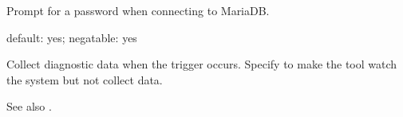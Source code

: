 \documentclass[letterpaper,10pt,english]{sphinxmanual}
\begin{document}
\begin{fulllineitems}
\label{\detokenize{mariadb-stat:cmdoption-mariadb-stat-ask-pass}}
\sphinxAtStartPar
Prompt for a password when connecting to MariaDB.

\end{fulllineitems}


\begin{fulllineitems}
\label{\detokenize{mariadb-stat:cmdoption-mariadb-stat-collect}}
\sphinxAtStartPar
default: yes; negatable: yes

\sphinxAtStartPar
Collect diagnostic data when the trigger occurs.  Specify 
to make the tool watch the system but not collect data.

\sphinxAtStartPar
See also {\hyperref[\detokenize{mariadb-stat:cmdoption-mariadb-stat-stalk}]{}}.

\end{fulllineitems}

\end{document}

